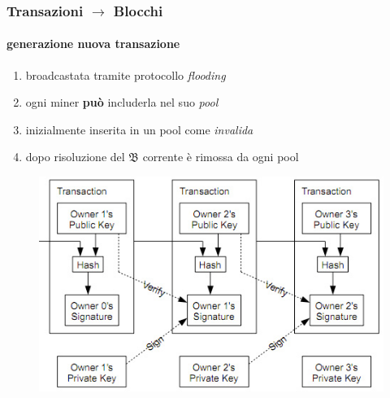 \begin{frame}
	\frametitle{Transazioni $\rightarrow$ Blocchi} 
	\framesubtitle{generazione nuova transazione}
	
	\begin{enumerate}
		\item broadcastata tramite protocollo \textit{flooding}
		\item ogni miner \textbf{può} includerla nel suo \textit{pool}
		\item inizialmente inserita in un pool come \textit{invalida}
		\item dopo risoluzione del $\mathfrak{B}$ corrente è rimossa da ogni pool
	\end{enumerate}

	\begin{figure}[H]
		\begin{center}
			\includegraphics[height = 4.5 cm]{images/chain_transactions.png}	
		\end{center}
	\end{figure}
\end{frame}